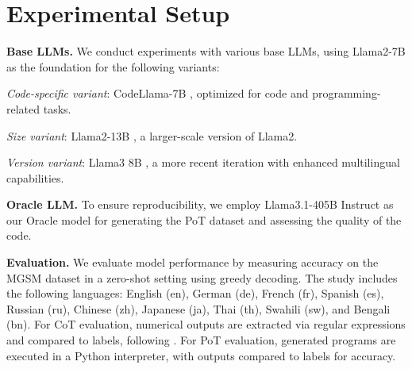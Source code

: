 \section{Experimental Setup}


\textbf{Base LLMs.} We conduct experiments with various base LLMs, using Llama2-7B \cite{Llama2} as the foundation for the following variants:
\begin{compactenum}[i)]
\item \emph{Code-specific variant}: CodeLlama-7B \cite{codeLlama}, optimized for code and programming-related tasks.
\item \emph{Size variant}: Llama2-13B \cite{Llama2}, a larger-scale version of Llama2.
\item \emph{Version variant}: Llama3 8B \cite{Llama3}, a more recent iteration with enhanced multilingual capabilities. 
\end{compactenum}

\noindent\textbf{Oracle LLM.} To ensure reproducibility, we employ Llama3.1-405B Instruct \cite{Llama3} as our Oracle model for generating the PoT dataset and assessing the quality of the code.




\vspace{2mm}
\noindent \textbf{Evaluation.}
We evaluate model performance by measuring accuracy on the MGSM \cite{mgsm} dataset in a zero-shot setting using greedy decoding.
%
The study includes the following languages: English (en), German (de), French (fr), Spanish (es), Russian (ru), Chinese (zh), Japanese (ja), Thai (th), Swahili (sw), and Bengali (bn).
%
For CoT evaluation, numerical outputs are extracted via regular expressions and compared to labels, following \citet{mathoctopus}.
For PoT evaluation, generated programs are executed in a Python interpreter, with outputs compared to labels for accuracy.





